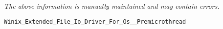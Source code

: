 \label{pkg:winix\_data\_file\_io\_driver\_for\_posix\_\_premicrothread}

{\tiny \it The above information is manually maintained and may contain errors.}
\begin{verbatim}
Winix_Extended_File_Io_Driver_For_Os__Premicrothread
\end{verbatim}
